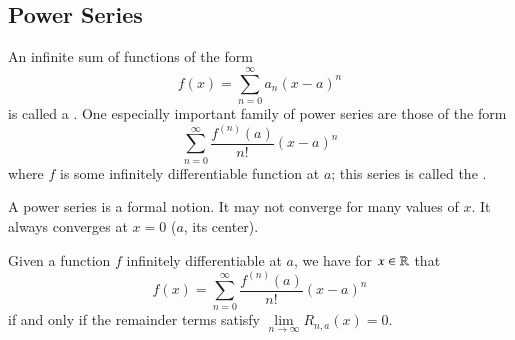 \subsection{Power Series}


\begin{defn}
    An infinite sum of functions of the form \begin{equation*}
        f(x) = \sum\limits_{n=0}^{\infty}a_n(x-a)^n
    \end{equation*}
    is called a . One especially important family of power series are those of the form \begin{equation*}
        \sum\limits_{n=0}^{\infty}\frac{f^{(n)}(a)}{n!}(x-a)^n
    \end{equation*}
    where $f$ is some infinitely differentiable function at $a$; this series is called the .
\end{defn}

A power series is a formal notion. It may not converge for many values of $x$. It always converges at $x = 0$ ($a$, its center).


\begin{rmk}
    Given a function $f$ infinitely differentiable at $a$, we have for $x \in \mathbb R$ that \begin{equation*}
        f(x) = \sum\limits_{n=0}^{\infty}\frac{f^{(n)}(a)}{n!}(x-a)^n
    \end{equation*}
    if and only if the remainder terms satisfy $\lim\limits_{n\rightarrow \infty}R_{n,a}(x) = 0$.
\end{rmk}



